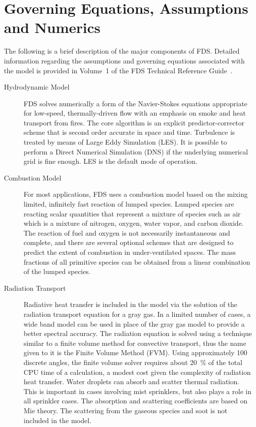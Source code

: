 \documentclass[11pt]{book}
\begin{document}
\section{Governing Equations, Assumptions and Numerics}

The following is a brief description of the major components of FDS. Detailed information regarding the assumptions and governing equations associated with the model is provided in Volume~1 of the FDS Technical Reference Guide~\cite{FDS_Tech_Guide}.
\begin{description}
\item[Hydrodynamic Model] FDS solves numerically a form of the Navier-Stokes equations appropriate for low-speed, thermally-driven flow with an emphasis on smoke and heat transport from fires. The core algorithm is an explicit predictor-corrector scheme that is second order accurate in space and time. Turbulence is treated by means of Large Eddy Simulation (LES). It is possible to perform a Direct Numerical Simulation (DNS) if the underlying numerical grid is fine enough. LES is the default mode of operation.
\item[Combustion Model] For most applications, FDS uses a combustion model based on the mixing limited, infinitely fast reaction of lumped species. Lumped species are reacting scalar quantities that represent a mixture of species such as air which is a mixture of nitrogen, oxygen, water vapor, and carbon dioxide. The reaction of fuel and oxygen is not necessarily instantaneous and complete, and there are several optional schemes that are designed to predict the extent of combustion in under-ventilated spaces. The mass fractions of all primitive species can be obtained from a linear combination of the lumped species.
\item[Radiation Transport] Radiative heat transfer is included in the model via the solution of the radiation transport equation for a gray gas. In a limited number of cases, a wide band model can be used in place of the gray gas model to provide a better spectral accuracy. The radiation equation is solved using a technique similar to a finite volume method for convective transport, thus the name given to it is the Finite Volume Method (FVM). Using approximately 100 discrete angles, the finite volume solver requires about 20~\% of the total CPU time of a calculation, a modest cost given the complexity of radiation heat transfer.  Water droplets can absorb and scatter thermal radiation. This is important in cases involving mist sprinklers, but also plays a role in all sprinkler cases. The absorption and scattering coefficients are based on Mie theory. The scattering from the gaseous species and soot is not included in the model.

\end{description}
\end{document}
